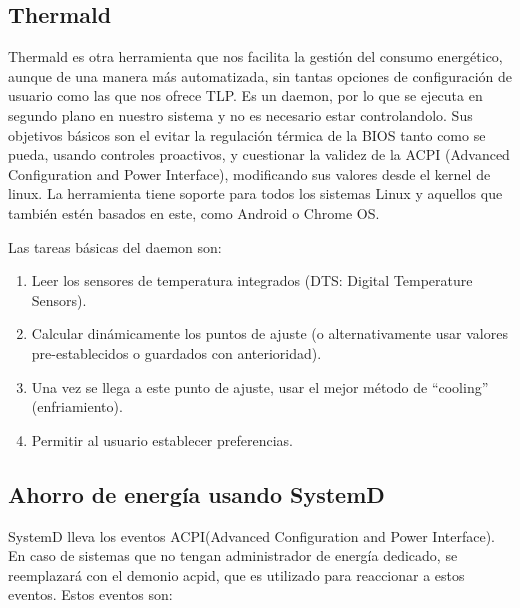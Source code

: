 \documentclass[12pt, spanish]{article}
\begin{document}
\subsection{Thermald}

Thermald es otra herramienta que nos facilita la gestión del consumo energético, aunque de una manera más automatizada, sin tantas opciones de configuración de usuario como las que nos ofrece TLP. Es un daemon, por lo que se ejecuta en segundo plano en nuestro sistema y no es necesario estar controlandolo. Sus objetivos básicos son el evitar la regulación térmica de la BIOS tanto como se pueda, usando controles proactivos,  y cuestionar la validez de la ACPI (Advanced Configuration and Power Interface), modificando sus valores desde el kernel de linux. La herramienta tiene soporte para todos los sistemas Linux y aquellos que también estén basados en este, como Android o Chrome OS.


Las tareas básicas del daemon son: 

\begin{enumerate}
\item{Leer los sensores de temperatura integrados (DTS: Digital Temperature Sensors).}
\item{Calcular dinámicamente los puntos de ajuste (o alternativamente usar valores pre-establecidos o guardados con anterioridad).}
\item{Una vez se llega a este punto de ajuste, usar el mejor método de “cooling” (enfriamiento).}
\item{Permitir al usuario establecer preferencias.}
\end{enumerate}



\subsection{Ahorro de energía usando SystemD}
SystemD lleva los eventos ACPI(Advanced Configuration and Power Interface). En caso de sistemas que no tengan administrador de energía dedicado, se reemplazará con el demonio acpid, que es utilizado para reaccionar a estos eventos. Estos eventos son:
\end{document}
